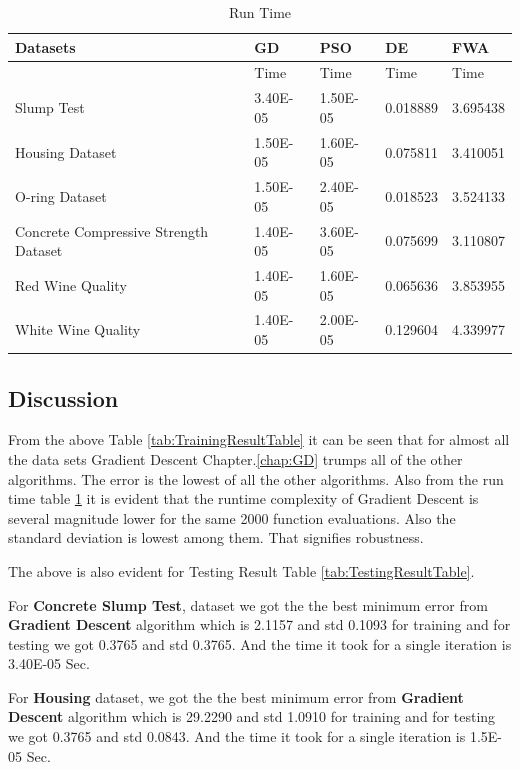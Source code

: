 \documentclass[11pt, a4paper]{report}
\begin{document}
\begin{table}[]
	\centering
	\caption{Run Time}
	\label{tab:RunningTime}
	\begin{tabular}{|l|l|l|l|l|}
		\hline
		Datasets                              & GD       & PSO      & DE       & FWA      \\ \hline
		& Time     & Time     & Time     & Time     \\ \hline
		Slump Test                            & 3.40E-05 & 1.50E-05 & 0.018889 & 3.695438 \\ \hline
		Housing Dataset                       & 1.50E-05 & 1.60E-05 & 0.075811 & 3.410051 \\ \hline
		O-ring Dataset                        & 1.50E-05 & 2.40E-05 & 0.018523 & 3.524133 \\ \hline
		Concrete Compressive Strength Dataset & 1.40E-05 & 3.60E-05 & 0.075699 & 3.110807 \\ \hline
		Red Wine Quality                      & 1.40E-05 & 1.60E-05 & 0.065636 & 3.853955 \\ \hline
		White Wine Quality                    & 1.40E-05 & 2.00E-05 & 0.129604 & 4.339977 \\ \hline
	\end{tabular}
\end{table}

\newpage
\subsection{Discussion}
From the above Table \ref{tab:TrainingResultTable} it can be seen that for almost all the data sets Gradient Descent Chapter.\ref{chap:GD} trumps all of the other algorithms. The error is the lowest of all the other algorithms. Also from the run time table \ref{tab:RunningTime} it is evident that  the runtime complexity of Gradient Descent is several magnitude lower for the same 2000 function evaluations. Also the standard deviation is lowest among them. That signifies robustness. 

The above is also evident for Testing Result Table \ref{tab:TestingResultTable}.


For \textbf{Concrete Slump Test}, dataset we got the the best minimum error from \textbf{Gradient Descent} algorithm which is 2.1157 and std 0.1093 for training and for testing we got 0.3765 and std 0.3765. And the time it took for a single iteration is 3.40E-05 Sec.

For \textbf{Housing} dataset, we got the the best minimum error from \textbf{Gradient Descent} algorithm which is 29.2290 and std 1.0910 for training and for testing we got 0.3765 and std 0.0843. And the time it took for a single iteration is 1.5E-05 Sec.
\end{document}
